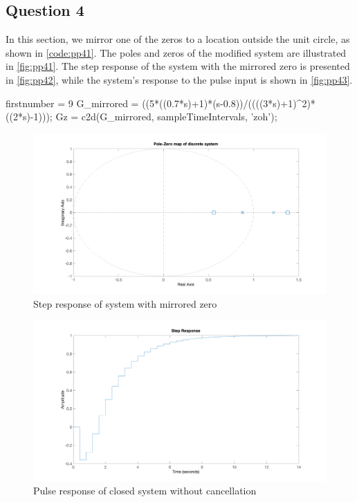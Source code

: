 \FloatBarrier
\subsection{Question 4}
In this section, we mirror one of the zeros to a location outside the unit circle, as shown in \autoref{code:pp41}. The poles and zeros of the modified system are illustrated in \autoref{fig:pp41}. The step response of the system with the mirrored zero is presented in \autoref{fig:pp42}, while the system’s response to the pulse input is shown in \autoref{fig:pp43}.

\begin{code}
	\begin{matlabcode}{firstnumber = 9}
	G_mirrored = ((5*((0.7*s)+1)*(s-0.8))/((((3*s)+1)^2)*((2*s)-1)));
	Gz = c2d(G_mirrored, sampleTimeIntervals, 'zoh');
	\end{matlabcode}
	\label{code:pp41}
\end{code}

\begin{figure}
	\centering
	\includegraphics[width=\textwidth]{images/pp41.png}
	\caption{Step response of system with mirrored zero}
	\label{fig:pp41}
\end{figure}

\begin{figure}
	\centering
	\includegraphics[width=\textwidth]{images/pp42.png}
	\caption{Pulse response of closed system without cancellation}
	\label{fig:pp42}
\end{figure}

